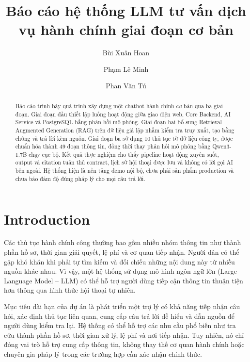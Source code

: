 \documentclass[runningheads]{llncs}
\begin{document}
\title{Báo cáo hệ thống LLM tư vấn dịch vụ hành chính giai đoạn cơ bản}

\author{Bùi Xuân Hoan \and Phạm Lê Minh \and Phan Văn Tú}


\maketitle

\begin{abstract}
Báo cáo trình bày quá trình xây dựng một chatbot hành chính cơ bản qua ba giai
đoạn. Giai đoạn đầu thiết lập luồng hoạt động giữa giao diện web, Core Backend,
AI Service và PostgreSQL bằng phản hồi mô phỏng. Giai đoạn hai bổ sung
Retrieval-Augmented Generation (RAG) trên dữ liệu giả lập nhằm kiểm tra truy xuất,
tạo bằng chứng và trả lời kèm nguồn. Giai đoạn ba sử dụng 10 thủ tục từ dữ liệu
công ty, được chuẩn hóa thành 49 đoạn thông tin, đồng thời thay phản hồi mô phỏng
bằng Qwen3-1.7B chạy cục bộ. Kết quả thực nghiệm cho thấy pipeline hoạt động xuyên
suốt, output và citation tuân thủ contract, lịch sử hội thoại được lưu và không có
lời gọi AI bên ngoài. Hệ thống hiện là nền tảng demo nội bộ, chưa phải sản phẩm
production và chưa bảo đảm độ đúng pháp lý cho mọi câu trả lời.

\end{abstract}

\section{Introduction}

Các thủ tục hành chính công thường bao gồm nhiều nhóm thông tin như thành phần hồ
sơ, thời gian giải quyết, lệ phí và cơ quan tiếp nhận. Người dân có thể gặp khó
khăn khi phải tự tìm kiếm và đối chiếu những nội dung này từ nhiều nguồn khác
nhau. Vì vậy, một hệ thống sử dụng mô hình ngôn ngữ lớn (Large Language Model --
LLM) có thể hỗ trợ người dùng tiếp cận thông tin thuận tiện hơn thông qua hình
thức hội thoại tự nhiên.

Mục tiêu dài hạn của dự án là phát triển một trợ lý có khả năng tiếp nhận câu
hỏi, xác định thủ tục liên quan, cung cấp câu trả lời dễ hiểu và dẫn nguồn để
người dùng kiểm tra lại. Hệ thống có thể hỗ trợ các nhu cầu phổ biến như tra cứu
thành phần hồ sơ, thời gian xử lý, lệ phí và nơi tiếp nhận. Tuy nhiên, nó chỉ đóng
vai trò hỗ trợ cung cấp thông tin, không thay thế cơ quan hành chính hoặc chuyên
gia pháp lý trong các trường hợp cần xác nhận chính thức.
\end{document}
